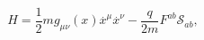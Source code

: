 \begin{equation}
H=\frac{1}{2}mg_{\mu \nu }(x)\stackrel{.}{x}^{\mu }\stackrel{.}{x}^{\nu }-%
\frac{q}{2m}F^{ab}\mathcal{S}_{ab},
\end{equation}

